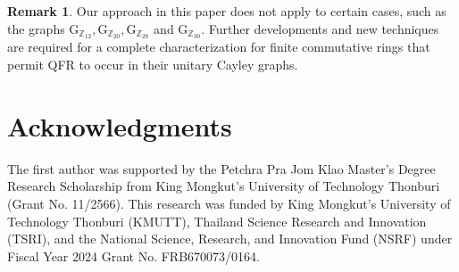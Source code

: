 \documentclass[12pt]{amsart}
\numberwithin{equation}{section}
\theoremstyle{definition}
\newtheorem{rmk}[thm]{Remark}
\theoremstyle{definition} \numberwithin{equation}{section}
\newcommand{\G}{\mathrm{G}}
\begin{document}
\begin{rmk}
    Our approach in this paper does not apply to certain cases, such as the graphs $\G_{\mathbb{Z}_{12}}, \G_{\mathbb{Z}_{20}}, \G_{\mathbb{Z}_{28}}$ and $\G_{\mathbb{Z}_{30}}$. Further developments and new techniques are required for a complete characterization for finite commutative rings that permit QFR to occur in their unitary Cayley graphs.
\end{rmk}

\bigskip

\section*{Acknowledgments}
The first author was supported by the Petchra Pra Jom Klao Master’s Degree Research Scholarship from King Mongkut’s University of Technology Thonburi (Grant No. 11/2566). This research was funded by King Mongkut’s University of Technology Thonburi (KMUTT), Thailand Science Research and Innovation (TSRI), and the National Science, Research, and Innovation Fund (NSRF) under Fiscal Year 2024 Grant No. FRB670073/0164.


\end{document}
